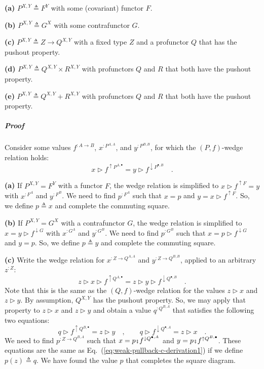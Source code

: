 \textbf{(a)} $P^{X,Y}\triangleq F^{Y}$ with some (covariant) functor
$F$.

\textbf{(b)} $P^{X,Y}\triangleq G^{X}$ with some contrafunctor $G$.

\textbf{(c)} $P^{X,Y}\triangleq Z\rightarrow Q^{X,Y}$ with a fixed
type $Z$ and a profunctor $Q$ that has the pushout property.

\textbf{(d)} $P^{X,Y}\triangleq Q^{X,Y}\times R^{X,Y}$ with profunctors
$Q$ and $R$ that both have the pushout property.

\textbf{(e)} $P^{X,Y}\triangleq Q^{X,Y}+R^{X,Y}$ with profunctors
$Q$ and $R$ that both have the pushout property.

\subparagraph{Proof}

Consider some values $f^{:A\rightarrow B}$, $x^{:P^{A,A}}$, and
$y^{:P^{B,B}}$, for which the $\left(P,f\right)$-wedge relation
holds:
\[
x\triangleright f^{\uparrow P^{A,\bullet}}=y\triangleright f^{\downarrow P^{\bullet,B}}\quad.
\]

\textbf{(a)} If $P^{X,Y}=F^{Y}$ with a functor $F$, the wedge relation
is simplified to $x\triangleright f^{\uparrow F}=y$ with $x^{:F^{A}}$
and $y^{:F^{B}}$. We need to find $p^{:F^{A}}$ such that $x=p$
and $y=x\triangleright f^{\uparrow F}$. So, we define $p\triangleq x$
and complete the commuting square.

\textbf{(b)} If $P^{X,Y}=G^{X}$ with a contrafunctor $G$, the wedge
relation is simplified to $x=y\triangleright f^{\downarrow G}$ with
$x^{:G^{A}}$ and $y^{:G^{B}}$. We need to find $p^{:G^{B}}$ such
that $x=p\triangleright f^{\downarrow G}$ and $y=p$. So, we define
$p\triangleq y$ and complete the commuting square.

\textbf{(c)} Write the wedge relation for $x^{:Z\rightarrow Q^{A,A}}$
and $y^{:Z\rightarrow Q^{B,B}}$, applied to an arbitrary $z^{:Z}$:
\[
z\triangleright x\triangleright f^{\uparrow Q^{A,\bullet}}=z\triangleright y\triangleright f^{\downarrow Q^{\bullet,B}}\quad.
\]
Note that this is the same as the $\left(Q,f\right)$-wedge relation
for the values $z\triangleright x$ and $z\triangleright y$. By assumption,
$Q^{X,Y}$ has the pushout property. So, we may apply that property
to $z\triangleright x$ and $z\triangleright y$ and obtain a value
$q^{:Q^{B,A}}$ that satisfies the following two equations:
\begin{equation}
q\triangleright f^{\uparrow Q^{B,\bullet}}=z\triangleright y\quad,\quad\quad q\triangleright f^{\downarrow Q^{\bullet,A}}=z\triangleright x\quad.\label{eq:weak-pullback-c-derivation1}
\end{equation}
We need to find $p^{:Z\rightarrow Q^{B,A}}$ such that $x=p\bef f^{\downarrow Q^{\bullet,A}}$
and $y=p\bef f^{\uparrow Q^{B,\bullet}}$. These equations are the
same as Eq.~(\ref{eq:weak-pullback-c-derivation1}) if we define
$p(z)\triangleq q$. We have found the value $p$ that completes the
square diagram.

